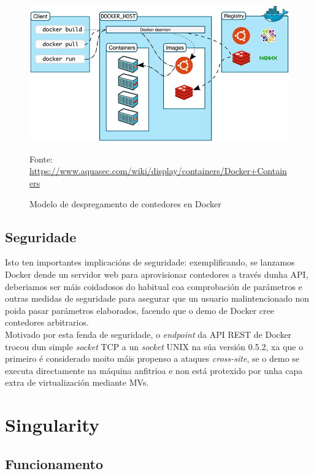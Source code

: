 \begin{figure}
\centerline{\includegraphics[width=15cm]{figuras/dockerStructure2}}
\caption{Modelo de despregamento de contedores en Docker}
\medskip
\small
\centerline{Fonte: \url{https://www.aquasec.com/wiki/display/containers/Docker+Containers}}
\label{dockerStructure2}
\end{figure}

\subsection{Seguridade}

Isto ten importantes implicacións de seguridade: exemplificando, se lanzamos Docker dende un servidor web para aprovisionar contedores a través dunha \gls{API}, deberiamos ser máis coidadosos do habitual coa comprobación de parámetros e outras medidas de seguridade para asegurar que un usuario malintencionado non poida pasar parámetros elaborados, facendo que o demo de Docker cree contedores arbitrarios.\\

Motivado por esta fenda de seguridade, o \textit{endpoint} da \gls{API} \gls{REST} de Docker trocou dun simple \textit{socket} \gls{TCP} a un \textit{socket} UNIX na súa versión 0.5.2, xa que o primeiro é considerado moito máis propenso a ataques \textit{cross-site}, se o demo se executa directamente na máquina anfitrioa e non está protexido por unha capa extra de virtualización mediante \gls{MV}s.

\section{Singularity}

\subsection{Funcionamento}

